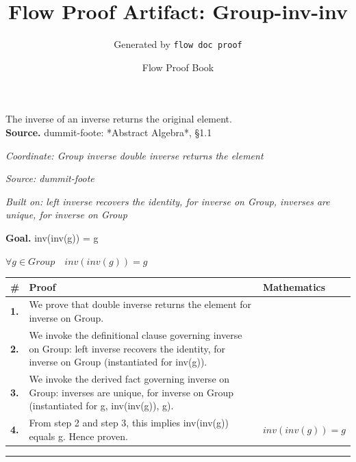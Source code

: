 \documentclass[11pt]{article}
\title{Flow Proof Artifact: Group-inv-inv}
\author{Generated by \texttt{flow doc proof}}
\date{Flow Proof Book}
\theoremstyle{definition}
\begin{document}
\maketitle
The inverse of an inverse returns the original element.\\[0.5em]
\textbf{Source.} dummit-foote: *Abstract Algebra*, §1.1\\[0.5em]
\bigskip
{}\par
\smallskip\noindent\textit{Coordinate: Group \cdot inverse \cdot double inverse returns the element}\par
\smallskip\noindent\textit{Source: dummit-foote}\par
\smallskip\noindent\textit{Built on: left inverse recovers the identity, for inverse on Group, inverses are unique, for inverse on Group}\par
\medskip
\noindent\textbf{Goal.} inv(inv(g)) = g\par
\noindent$\displaystyle \forall g \in Group\quad inv(inv(g)) = g$\par
\medskip
\noindent
\begin{tabular}{@{} >{\raggedright\arraybackslash}p{} >{\raggedright\arraybackslash}p{} >{\raggedleft\arraybackslash}p{} @{}}
\textbf{\#} & \textbf{Proof} & \textbf{Mathematics} \\
\midrule
\textbf{1.} & We prove that double inverse returns the element for inverse on Group. & \\[0.45em]
\textbf{2.} & We invoke the definitional clause governing inverse on Group: left inverse recovers the identity, for inverse on Group (instantiated for inv(g)). & \\[0.45em]
\textbf{3.} & We invoke the derived fact governing inverse on Group: inverses are unique, for inverse on Group (instantiated for g, inv(inv(g)), g). & \\[0.45em]
\textbf{4.} & From step 2 and step 3, this implies inv(inv(g)) equals g. Hence proven. & $\displaystyle inv(inv(g)) = g$ \\[0.45em]
\bottomrule
\end{tabular}
\label{thm:Group-inverse-double_inverse_returns_the_element}
\par\medskip\hrule
\end{document}
